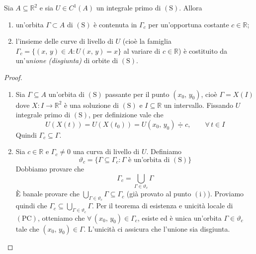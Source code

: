 \begin{thm}
Sia $A \subseteq \mathbb{R}^2$ e sia $U \in C^1(A)$ un integrale primo di $\mathrm{(S)}$. Allora
\begin{enumerate}[labelindent=\parindent,leftmargin=*,label=\textnormal{(\roman*)},start=1]
\item un'orbita $\Gamma \subset A$ di $\mathrm{(S)}$ è contenuta in $\Gamma_c$ per un'opportuna costante $c \in \mathbb{R}$;
\item l'insieme delle curve di livello di $U$ (cioè la famiglia $\Gamma_c = \lbrace (x,\,y) \in A : U(x,\,y) = x \rbrace$ al variare di $c \in \mathbb{R}$) è costituito da un'\emph{unione (disgiunta)} di orbite di $\mathrm{(S)}$.
\end{enumerate}
\end{thm}
\begin{proof}
\mbox{}
\begin{enumerate}[labelindent=\parindent,leftmargin=*,label=\textnormal{(\roman*)},start=1]
\item Sia $\Gamma \subseteq A$ un'orbita di $\mathrm{(S)}$ passante per il punto $(x_0,\,y_0)$, cioè $\Gamma = X(I)$ dove $X : I \longrightarrow \mathbb{R}^2$ è una soluzione di $\mathrm{(S)}$ e $I \subseteq \mathbb{R}$ un intervallo. Fissando $U$ integrale primo di $\mathrm{(S)}$, per definizione vale che
$$
U(X(t)) = U(X(t_0)) = U(x_0,\,y_0) \doteqdot c, \qquad \forall \, t \in I
$$
Quindi $\Gamma_c \subseteq \Gamma$.
\item Sia $c \in \mathbb{R}$ e $\Gamma_c \neq 0$ una curva di livello di $U$. Definiamo
$$
\vartheta_c = \lbrace \Gamma \subseteq \Gamma_c : \Gamma \text{ è un'orbita di } \mathrm{(S)} \rbrace
$$
Dobbiamo provare che
$$
\Gamma_c = \bigcup_{\Gamma \in \vartheta_c} \Gamma
$$
\`{E} banale provare che $\bigcup_{\Gamma \in \vartheta_c} \Gamma \subseteq \Gamma_c$ (già provato al punto $\mathrm{(i)}$). Proviamo quindi che $\Gamma_c \subseteq \bigcup_{\Gamma \in \vartheta_c} \Gamma$. Per il teorema di esistenza e unicità locale di $\mathrm{(PC)}$, otteniamo che $\forall \, (x_0,\,y_0) \in \Gamma_c$, esiste ed è unica un'orbita $\Gamma \in \vartheta_c$ tale che $(x_0,\,y_0) \in \Gamma$. L'unicità ci assicura che l'unione sia disgiunta.
\end{enumerate}
\end{proof}

